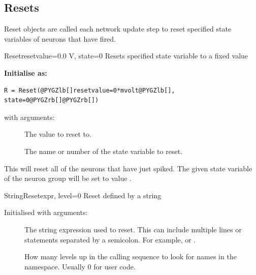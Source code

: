 \documentclass[letterpaper,10pt,english]{manual}
\begin{document}
\subsection{Resets}

Reset objects are called each network update step to reset
specified state variables of neurons that have fired.

\hypertarget{brian.Reset}{}\begin{classdesc}{Reset}{resetvalue=0.0 V, state=0}
Resets specified state variable to a fixed value

\textbf{Initialise as:}

\begin{Verbatim}[commandchars=@\[\]]
R = Reset(@PYGZlb[]resetvalue=0*mvolt@PYGZlb[], state=0@PYGZrb[]@PYGZrb[])
\end{Verbatim}

with arguments:
\begin{description}
\item[]
The value to reset to.

\item[]
The name or number of the state variable to reset.

\end{description}

This will reset all of the neurons that have just spiked. The
given state variable of the neuron group will be set to value
.
\end{classdesc}

\hypertarget{brian.StringReset}{}\begin{classdesc}{StringReset}{expr, level=0}
Reset defined by a string

Initialised with arguments:
\begin{description}
\item[]
The string expression used to reset. This can include 
multiple lines or statements separated by a semicolon.
For example,  or .

\item[]
How many levels up in the calling sequence to look for
names in the namespace. Usually 0 for user code.

\end{description}
\end{classdesc}
\end{document}
